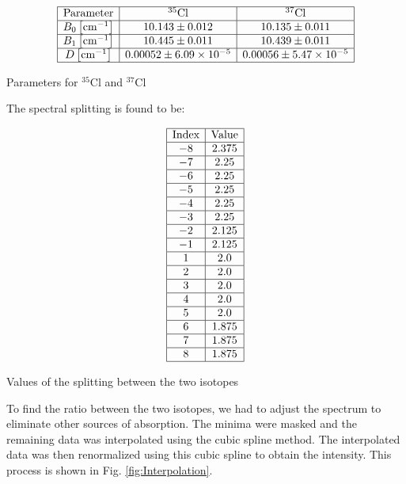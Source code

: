 \documentclass{article}
\begin{document}
\begin{table}[h!]
    \centering
    \[
    \begin{array}{|c|c|c|}
    \hline \text{Parameter} &^{35} \mathrm{Cl} & ^{37} \mathrm{Cl} \\
    \hline B_0\left[\mathrm{cm}^{-1}\right] & 10.143 \pm 0.012 & 10.135 \pm 0.011 \\
    \hline B_1\left[\mathrm{cm}^{-1}\right] & 10.445 \pm 0.011 & 10.439 \pm 0.011 \\
    \hline D\left[\mathrm{cm}^{-1}\right] & 0.00052 \pm 6.09 \times 10^{-5} &  0.00056 \pm 5.47 \times 10^{-5} \\
    \hline
    \end{array}
    \]
    \caption{Parameters for $^{35} \mathrm{Cl}$ and $^{37} \mathrm{Cl}$}
    \label{table:parameters_HCl}
\end{table}

The spectral splitting is found to be: 

\begin{table}[H]
    \centering
    \[
    \begin{array}{|c|c|}
    \hline \text{Index} & \text{Value} \\
    \hline -8 & 2.375 \\
    \hline -7 & 2.25 \\
    \hline -6 & 2.25 \\
    \hline -5 & 2.25 \\
    \hline -4 & 2.25 \\
    \hline -3 & 2.25 \\
    \hline -2 & 2.125 \\
    \hline -1 & 2.125 \\
    \hline 1 & 2.0 \\
    \hline 2 & 2.0 \\
    \hline 3 & 2.0 \\
    \hline 4 & 2.0 \\
    \hline 5 & 2.0 \\
    \hline 6 & 1.875 \\
    \hline 7 & 1.875 \\
    \hline 8 & 1.875 \\
    \hline
    \end{array}
    \]
    \caption{Values of the splitting between the two isotopes}
    \label{table:splitting_values}
\end{table}

To find the ratio between the two isotopes, we had to adjust the spectrum to eliminate other sources of absorption. The minima were masked and the remaining data was interpolated using the cubic spline method. The interpolated data was then renormalized using this cubic spline to obtain the intensity. This process is shown in Fig. \ref{fig:Interpolation}.
\end{document}
